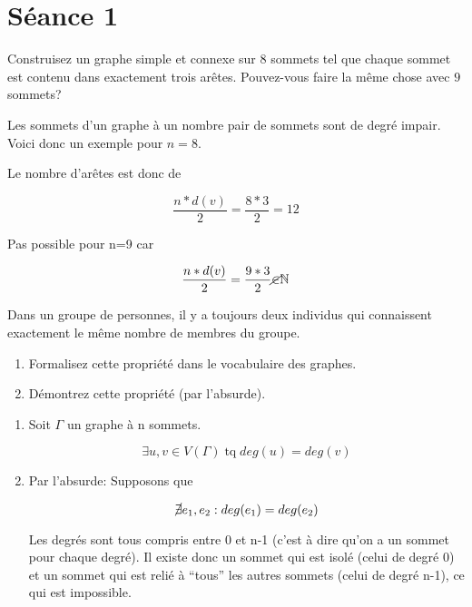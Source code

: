 
\section{Séance 1}

\begin{exo}
Construisez un graphe simple et connexe sur $8$ sommets tel que chaque sommet est contenu dans exactement trois ar\^etes. Pouvez-vous faire la m\^eme chose avec $9$ sommets?
\end{exo}

Les sommets d'un graphe à un nombre pair de sommets sont de degré impair. Voici donc un exemple pour $n=8$.

\begin{figure}[!h]
\centering

\end{figure}

Le nombre d'arêtes est donc de

\[ \frac{n*d(v)}{2} = \frac{8*3}{2} = 12 \] 

Pas possible pour n=9 car 

\[ \frac{n*d(v)}{2} = \frac{9*3}{2} \cancel{\in} \mathbb{N} \]


\begin{exo}
Dans un groupe de personnes, il y a toujours deux individus qui connaissent exactement le m\^eme nombre de membres du groupe.
\begin{enumerate}
\item Formalisez cette propri\'et\'e dans le vocabulaire des graphes.
\item D\'emontrez cette propri\'et\'e (par l'absurde).
\end{enumerate}
\end{exo}

\begin{enumerate}
\item Soit $\Gamma$ un graphe à n sommets.

\[ \exists u,v \in V(\Gamma) \; \text{tq} \; deg(u)=deg(v) \]

\item Par l'absurde: Supposons que 

\[ \cancel{\exists}{} e_{1}, e_{2}: deg(e_{1}) = deg(e_{2}) \] 

Les degrés sont tous compris entre 0 et n-1 (c'est à dire qu'on a un sommet pour chaque degré). Il existe donc un sommet qui est isolé (celui de degré 0) et un sommet qui est relié à ``tous'' les autres sommets (celui de degré n-1), ce qui est impossible.
\end{enumerate}

